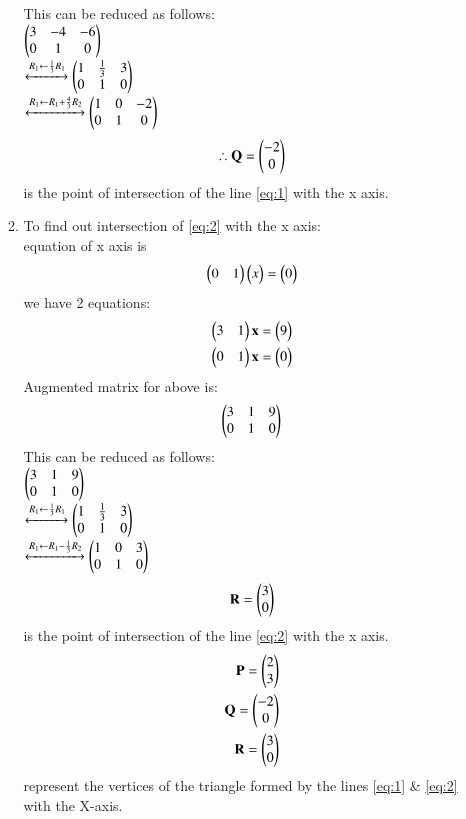 \documentclass[journal,12pt,twocolumn]{IEEEtran}
\renewcommand\thesection{\arabic{section}}
\begin{document}
\begin{enumerate}[label=\thesection.\arabic*.,ref=\thesection.\theenumi]
\begin{enumerate}
This can be reduced as follows:\\
$\begin{pmatrix}3 & -4 & -6\\
           0 & 1 & 0\end{pmatrix}$\\
    $\xleftrightarrow {R_1 \leftarrow \frac{1}{3}R_1}
    \begin{pmatrix}1 & \frac{1}{3} & 3\\
          0 & 1 & 0\end{pmatrix}\\$\\
          $\xleftrightarrow{R_1 \leftarrow R_1 + \frac{4}{3}R_2}
    \begin{pmatrix}1 &0&-2\\
        0&1&0\end{pmatrix}\\$
\begin{align}
\therefore \mathbf{Q}=\begin{pmatrix}-2\\0\end{pmatrix}
\end{align}
is the point of intersection of the line \ref{eq:1} with the x axis.
\item To find out intersection of \ref{eq:2} with the x axis:\\
    equation of x axis is 
        \begin{align}
        \begin{pmatrix}0&1\end{pmatrix}\begin{pmatrix}x\end{pmatrix}=\begin{pmatrix}0\end{pmatrix}
    \end{align}
    we have 2 equations: \begin{align}
        \begin{pmatrix}3&1\end{pmatrix}\mathbf{x}=\begin{pmatrix}9\end{pmatrix}\\
        \begin{pmatrix}0&1\end{pmatrix}\mathbf{x}=\begin{pmatrix}0\end{pmatrix}
    \end{align}
    Augmented matrix for above is:
\begin{align}
    \begin{pmatrix}3 & 1 & 9\\
           0 & 1 & 0\end{pmatrix}
\end{align}
This can be reduced as follows:\\
$\begin{pmatrix}3 & 1 & 9\\
           0 & 1 & 0\end{pmatrix}$\\
    $\xleftrightarrow {R_1 \leftarrow \frac{1}{3}R_1}
    \begin{pmatrix}1 & \frac{1}{3} & 3\\
          0 & 1 & 0\end{pmatrix}\\$\\
          $\xleftrightarrow{R_1 \leftarrow R_1 - \frac{1}{3}R_2}
    \begin{pmatrix}1 &0&3\\
        0&1&0\end{pmatrix}\\$
\begin{align}
    \mathbf{R}=\begin{pmatrix}3\\0\end{pmatrix}
\end{align}
is the point of intersection of the line \ref{eq:2} with the x axis.
\\
    \begin{align}
        \mathbf{P}=\begin{pmatrix}2\\3\end{pmatrix}\\ \mathbf{Q}=\begin{pmatrix}-2\\0\end{pmatrix}\\ \mathbf{R}=\begin{pmatrix}3\\0\end{pmatrix}\\
    \end{align}
    represent the vertices of the triangle formed by the lines \ref{eq:1} \& \ref{eq:2}
    with the X-axis.\\\\


\end{enumerate}
\end{enumerate}
\end{document}
